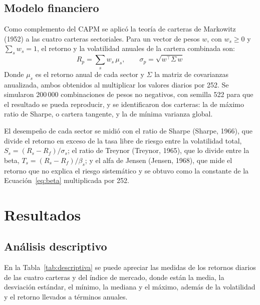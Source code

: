 \documentclass[jrfm,article,submit,oneauthor]{Definitions/mdpi}
\begin{document}
\subsection{Modelo financiero}
Como complemento del CAPM se aplicó la teoría de carteras de Markowitz (1952) a las cuatro carteras sectoriales. Para un vector de pesos $w$, con $w_s \geq 0$ y $\sum_s w_s = 1$, el retorno y la volatilidad anuales de la cartera combinada son:
\begin{equation}
R_p = \sum_{s} w_s\, \mu_s, \qquad \sigma_p = \sqrt{w^{\top} \Sigma\, w}
\label{eq:markowitz}
\end{equation}
\noindent Donde $\mu_s$ es el retorno anual de cada sector y $\Sigma$ la matriz de covarianzas anualizada, ambos obtenidos al multiplicar los valores diarios por 252. Se simularon 200\,000 combinaciones de pesos no negativos, con semilla 522 para que el resultado se pueda reproducir, y se identificaron dos carteras: la de máximo ratio de Sharpe, o cartera tangente, y la de mínima varianza global.

El desempeño de cada sector se midió con el ratio de Sharpe (Sharpe, 1966), que divide el retorno en exceso de la tasa libre de riesgo entre la volatilidad total, $S_s = (R_s - R_f)/\sigma_s$; el ratio de Treynor (Treynor, 1965), que lo divide entre la beta, $T_s = (R_s - R_f)/\beta_s$; y el alfa de Jensen (Jensen, 1968), que mide el retorno que no explica el riesgo sistemático y se obtuvo como la constante de la Ecuación~\ref{eq:beta} multiplicada por 252.

\section{Resultados}
\subsection{Análisis descriptivo}
En la Tabla~\ref{tab:descriptiva} se puede apreciar las medidas de los retornos diarios de las cuatro carteras y del índice de mercado, donde están la media, la desviación estándar, el mínimo, la mediana y el máximo, además de la volatilidad y el retorno llevados a términos anuales.
\end{document}
